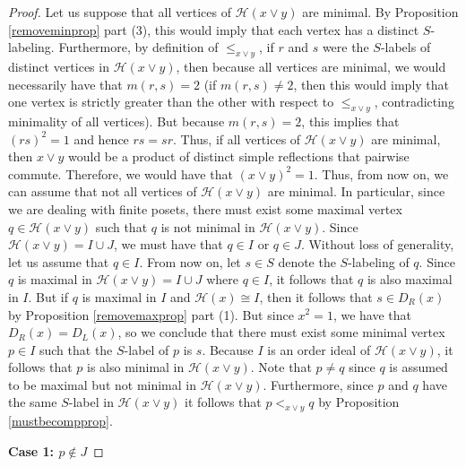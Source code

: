 \documentclass{amsart}
\theoremstyle{plain} %
\theoremstyle{definition}
\def\H#1{\mathcal{H}(#1)}
\begin{document}
\begin{proof}
    Let us suppose that all vertices of $ \H{x \vee y}$ are minimal. By Proposition \ref{removeminprop} part (3), this would imply that each vertex has a distinct $S$-labeling. Furthermore, by definition of $ \leq_{x\vee y}$, if $ r$ and $s$ were the $S$-labels of distinct vertices in $ \H{x\vee y}$, then because all vertices are minimal, we would necessarily have that $ m(r,s)  =2$ (if $m(r,s)\neq 2$, then this would imply that one vertex is strictly greater than the other with respect to $ \leq_{x\vee y}$, contradicting minimality of all vertices). But because $ m(r,s) = 2$, this implies that $ (rs)^{2} = 1$ and hence $ rs=sr$. Thus, if all vertices of $ \H{x\vee y}$ are minimal, then $ x\vee y$ would be a product of distinct simple reflections that pairwise commute. Therefore, we would have that $ (x\vee y)^{2} = 1$. Thus, from now on, we can assume that not all vertices of $ \H{x\vee y}$ are minimal. In particular, since we are dealing with finite posets, there must exist some maximal vertex $ q \in \H{x\vee y}$ such that $ q$ is not minimal in $ \H{x\vee y}$. Since $ \H{x\vee y} = I \cup J$, we must have that $ q\in I$ or $ q\in J$. Without loss of generality, let us assume that $ q\in I$. From now on, let $ s\in S$ denote the $S$-labeling of $q$. Since $ q$ is maximal in $ \H{x\vee y} = I \cup J$ where $ q\in I$, it follows that $ q$ is also maximal in $I$. But if $ q$ is maximal in $I$ and $ \H{x} \cong I$, then it follows that $ s\in D_{R}(x)$ by Proposition \ref{removemaxprop} part (1). But since $ x^{2}=1$, we have that $ D_{R}(x) = D_{L}(x)$, so we conclude that there must exist some minimal vertex $ p \in I$ such that the $S$-label of $p$ is $s$. Because $ I$ is an order ideal of $\H{x\vee y}$, it follows that $p$ is also minimal in $ \H{x\vee y}$. Note that $ p \neq q$ since $ q$ is assumed to be maximal but not minimal in $ \H{x\vee y}$. Furthermore, since $p$ and $ q$ have the same $S$-label in $ \H{x\vee y}$ it follows that $p <_{x\vee y} q$ by Proposition \ref{mustbecompprop}.

    \textbf{Case 1: $p\notin J$}
    

\end{proof}
\end{document}
